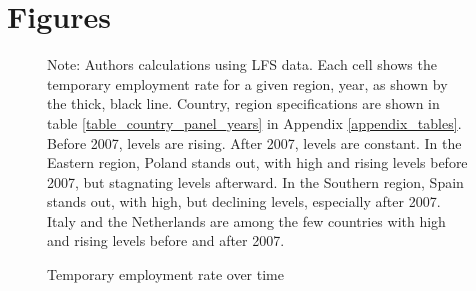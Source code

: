 \documentclass[12pt]{article}
\begin{document}
\section{Figures}


\begin{figure}[htp!]
    \caption{Temporary employment rate over time}
    \label{graph_eu_lfs_rate_region}

    \footnotesize{Note: Authors calculations using LFS data.  Each cell shows the temporary employment rate for a given region, year, as shown by the thick, black line.  Country, region specifications are shown in table \ref{table_country_panel_years} in Appendix \ref{appendix_tables}.  Before 2007, levels are rising.  After 2007, levels are constant.  In the Eastern region, Poland stands out, with high and rising levels before 2007, but stagnating levels afterward.  In the Southern region, Spain stands out, with high, but declining levels, especially after 2007.  Italy and the Netherlands are among the few countries with high and rising levels before and after 2007.}
\end{figure}
\end{document}

